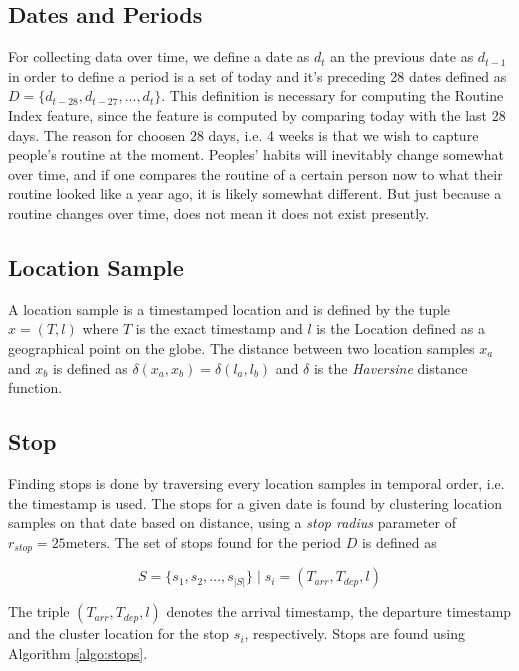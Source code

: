 \subsection{Dates and Periods}
For collecting data over time, we define a date as $d_t$ an the previous date as $d_{t-1}$ in order to define a period is a set of today and it's preceding 28 dates defined as $D = \{d_{t-28}, d_{t-27}, ..., d_{t}\}$. This definition is necessary for computing the Routine Index feature, since the feature is computed by comparing today with the last 28 days. The reason for choosen 28 days, i.e. 4 weeks is that we wish to capture people's routine at the moment. Peoples' habits will inevitably change somewhat over time, and if one compares the routine of a certain person now to what their routine looked like a year ago, it is likely somewhat different. But just because a routine changes over time, does not mean it does not exist presently.

\subsection{Location Sample}
A location sample is a timestamped location and is defined by the tuple $x = (T, l)$ where $T$ is the exact timestamp and $l$ is the Location defined as a geographical point on the globe. The distance between two location samples $x_a$ and $x_b$ is defined as $\delta(x_a, x_b) = \delta(l_a, l_b)$ and $\delta$ is the \textit{Haversine} distance function.

\subsection{Stop}
Finding stops is done by traversing every location samples in temporal order, i.e. the timestamp is used. The stops for a given date is found by clustering location samples on that date based on distance, using a \textit{stop radius} parameter of $r_{stop} = 25 \text{meters}$. The set of stops found for the period $D$ is defined as

\begin{equation}
\label{eq:feature-stops}
S = \{s_1, s_2, ..., s_{|S|}\} \;| \; s_i = (T_{arr}, T_{dep}, l)
\end{equation}

The triple $(T_{arr}, T_{dep}, l)$ denotes the arrival timestamp, the departure timestamp and the cluster location for the stop $s_i$, respectively. Stops are found using Algorithm \ref{algo:stops}.

